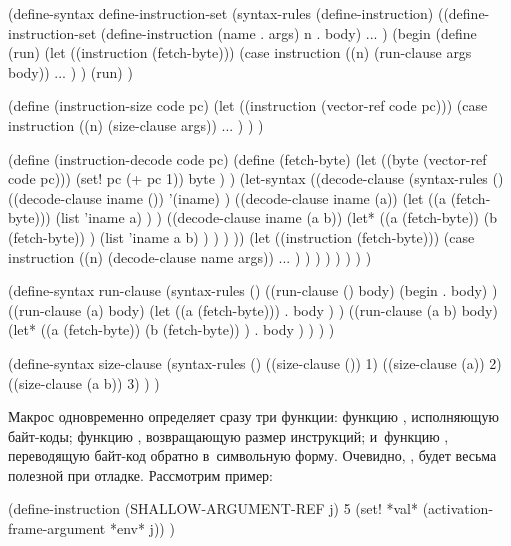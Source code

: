 \begin{code:lisp}
(define-syntax define-instruction-set
  (syntax-rules (define-instruction)
    ((define-instruction-set
       (define-instruction (name . args) n . body) ... )
     (begin
       (define (run)
         (let ((instruction (fetch-byte)))
           (case instruction
             ((n) (run-clause args body)) ... ) )
         (run) )

       (define (instruction-size code pc)
         (let ((instruction (vector-ref code pc)))
           (case instruction
             ((n) (size-clause args)) ... ) ) )

       (define (instruction-decode code pc)
         (define (fetch-byte)
           (let ((byte (vector-ref code pc)))
             (set! pc (+ pc 1))
             byte ) )
         (let-syntax
             ((decode-clause
               (syntax-rules ()
                 ((decode-clause iname ())
                  '(iname) )
                 ((decode-clause iname (a))
                  (let ((a (fetch-byte)))
                    (list 'iname a) ) )
                 ((decode-clause iname (a b))
                  (let* ((a (fetch-byte))
                         (b (fetch-byte)) )
                    (list 'iname a b) ) ) ) ))
           (let ((instruction (fetch-byte)))
             (case instruction
               ((n) (decode-clause name args)) ... ) ) ) ) ) ) ) )

(define-syntax run-clause
  (syntax-rules ()
    ((run-clause () body)
     (begin . body) )
    ((run-clause (a) body)
     (let ((a (fetch-byte)))
       . body ) )
    ((run-clause (a b) body)
     (let* ((a (fetch-byte))
            (b (fetch-byte)) )
       . body ) ) ) )

(define-syntax size-clause
  (syntax-rules ()
    ((size-clause ())    1)
    ((size-clause (a))   2)
    ((size-clause (a b)) 3) ) )
\end{code:lisp}

Макрос  одновременно определяет сразу три функции:
функцию , исполняющую байт-коды; функцию ,
возвращающую размер инструкций; и~функцию ,
переводящую байт-код обратно в~символьную форму. Очевидно,
, будет весьма полезной при отладке. Рассмотрим пример:

\begin{code:lisp}
(define-instruction (SHALLOW-ARGUMENT-REF j) 5
  (set! *val* (activation-frame-argument *env* j)) )
\end{code:lisp}

